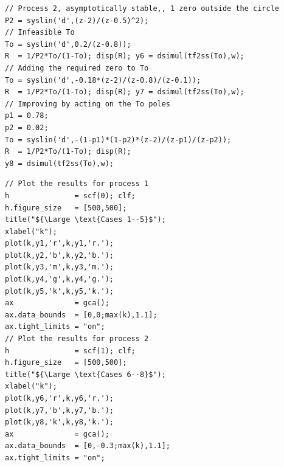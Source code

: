 \begin{frame}[fragile]
{\tiny
\def\baselinestretch{0.3}
\begin{verbatim}
// Process 2, asymptotically stable,, 1 zero outside the circle
P2 = syslin('d',(z-2)/(z-0.5)^2);
// Infeasible To
To = syslin('d',0.2/(z-0.8));
R  = 1/P2*To/(1-To); disp(R); y6 = dsimul(tf2ss(To),w);
// Adding the required zero to To
To = syslin('d',-0.18*(z-2)/(z-0.8)/(z-0.1));
R  = 1/P2*To/(1-To); disp(R); y7 = dsimul(tf2ss(To),w);
// Improving by acting on the To poles
p1 = 0.78;
p2 = 0.02;
To = syslin('d',-(1-p1)*(1-p2)*(z-2)/(z-p1)/(z-p2));
R  = 1/P2*To/(1-To); disp(R);
y8 = dsimul(tf2ss(To),w);
\end{verbatim}
}
\end{frame}

\begin{frame}[fragile]
{\tiny
\def\baselinestretch{0.3}
\begin{verbatim}
// Plot the results for process 1
h               = scf(0); clf;
h.figure_size   = [500,500];
title("${\Large \text{Cases 1--5}$");
xlabel("k");
plot(k,y1,'r',k,y1,'r.');
plot(k,y2,'b',k,y2,'b.');
plot(k,y3,'m',k,y3,'m.');
plot(k,y4,'g',k,y4,'g.');
plot(k,y5,'k',k,y5,'k.');
ax              = gca();
ax.data_bounds  = [0,0;max(k),1.1];
ax.tight_limits = "on";
// Plot the results for process 2
h               = scf(1); clf;
h.figure_size   = [500,500];
title("${\Large \text{Cases 6--8}$");
xlabel("k");
plot(k,y6,'r',k,y6,'r.');
plot(k,y7,'b',k,y7,'b.');
plot(k,y8,'k',k,y8,'k.');
ax              = gca();
ax.data_bounds  = [0,-0.3;max(k),1.1];
ax.tight_limits = "on";
\end{verbatim}
}
\end{frame}

